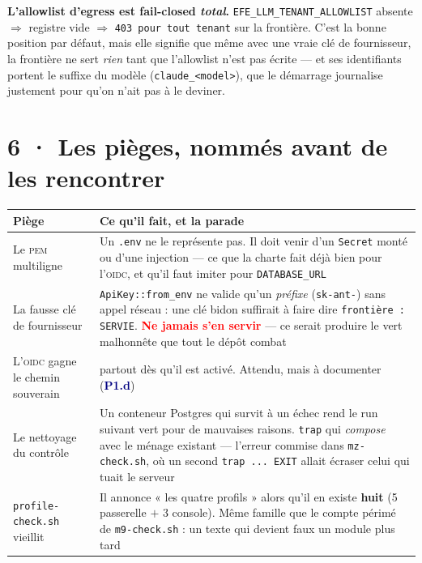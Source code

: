 \documentclass[10pt]{article}
\newcommand{\pire}[1]{\textcolor{red}{\textbf{#1}}}
\newcommand{\code}[1]{\texttt{\small #1}}
\newcommand{\mm}[1]{\textbf{\textcolor{navy}{#1}}}
\begin{document}
\textbf{L'allowlist d'egress est fail-closed \emph{total}.} \code{EFE\_LLM\_TENANT\_ALLOWLIST}
absente $\Rightarrow$ registre vide $\Rightarrow$ \code{403 pour tout tenant} sur la frontière.
C'est la bonne position par défaut, mais elle signifie que même avec une vraie clé de fournisseur,
la frontière ne sert \emph{rien} tant que l'allowlist n'est pas écrite --- et ses identifiants
portent le suffixe du modèle (\code{claude\_<model>}), que le démarrage journalise justement pour
qu'on n'ait pas à le deviner.

\section{6 · Les pièges, nommés avant de les rencontrer}

\begin{center}\small
\renewcommand{\arraystretch}{1.26}
\begin{tabular}{@{}>{\raggedright\arraybackslash}p{5.2cm} >{\raggedright\arraybackslash}p{10.3cm}@{}}
\toprule
\textbf{Piège} & \textbf{Ce qu'il fait, et la parade} \\
\midrule
Le \textsc{pem} multiligne & Un \code{.env} ne le représente pas. Il doit venir d'un \code{Secret} monté ou d'une injection --- ce que la charte fait déjà bien pour l'\textsc{oidc}, et qu'il faut imiter pour \code{DATABASE\_URL} \\
La fausse clé de fournisseur & \code{ApiKey::from\_env} ne valide qu'un \emph{préfixe} (\code{sk-ant-}) sans appel réseau : une clé bidon suffirait à faire dire \code{frontière : SERVIE}. \pire{Ne jamais s'en servir} --- ce serait produire le vert malhonnête que tout le dépôt combat \\
L'\textsc{oidc} gagne le chemin souverain & 401 partout dès qu'il est activé. Attendu, mais à documenter (\mm{P1.d}) \\
Le nettoyage du contrôle & Un conteneur Postgres qui survit à un échec rend le run suivant vert pour de mauvaises raisons. \code{trap} qui \emph{compose} avec le ménage existant --- l'erreur commise dans \code{mz-check.sh}, où un second \code{trap ... EXIT} allait écraser celui qui tuait le serveur \\
\code{profile-check.sh} vieillit & Il annonce « les quatre profils » alors qu'il en existe \textbf{huit} (5 passerelle $+$ 3 console). Même famille que le compte périmé de \code{m9-check.sh} : un texte qui devient faux un module plus tard \\
\bottomrule
\end{tabular}
\end{center}
\end{document}
